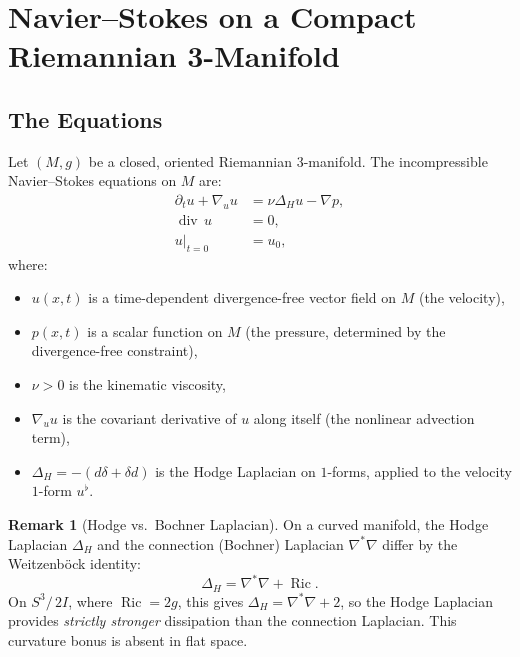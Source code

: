 \documentclass[11pt,a4paper]{article}
\theoremstyle{plain}
\theoremstyle{definition}
\newtheorem{remark}[theorem]{Remark}
\DeclareMathOperator{\Ric}{Ric}
\DeclareMathOperator{\dv}{div}
\newcommand{\Lap}{\Delta}                 %
\newcommand{\DS}{S^3\!/\,2I}             %
\begin{document}
\section{Navier--Stokes on a Compact Riemannian 3-Manifold}\label{sec:NSonM}

\subsection{The Equations}

Let $(M, g)$ be a closed, oriented Riemannian $3$-manifold.  The
incompressible Navier--Stokes equations on $M$ are:
\begin{align}
  \partial_t u + \nabla_u u &= \nu \Lap_H u - \nabla p,
    \label{eq:NS-momentum}\\
  \dv\, u &= 0, \label{eq:NS-div}\\
  u\big|_{t=0} &= u_0, \label{eq:NS-initial}
\end{align}
where:
\begin{itemize}[nosep]
  \item $u(x,t)$ is a time-dependent divergence-free vector field on $M$
        (the velocity),
  \item $p(x,t)$ is a scalar function on $M$ (the pressure, determined by the
        divergence-free constraint),
  \item $\nu > 0$ is the kinematic viscosity,
  \item $\nabla_u u$ is the covariant derivative of $u$ along itself
        (the nonlinear advection term),
  \item $\Lap_H = -(d\delta + \delta d)$ is the Hodge Laplacian on $1$-forms,
        applied to the velocity $1$-form $u^\flat$.
\end{itemize}

\begin{remark}[Hodge vs.\ Bochner Laplacian]
On a curved manifold, the Hodge Laplacian $\Lap_H$ and the connection
(Bochner) Laplacian $\nabla^*\nabla$ differ by the Weitzenb\"{o}ck identity:
\begin{equation}\label{eq:weitzenbock}
  \Lap_H = \nabla^*\nabla + \Ric.
\end{equation}
On $\DS$, where $\Ric = 2g$, this gives $\Lap_H = \nabla^*\nabla + 2$, so
the Hodge Laplacian provides \emph{strictly stronger} dissipation than the
connection Laplacian.  This curvature bonus is absent in flat space.
\end{remark}
\end{document}
